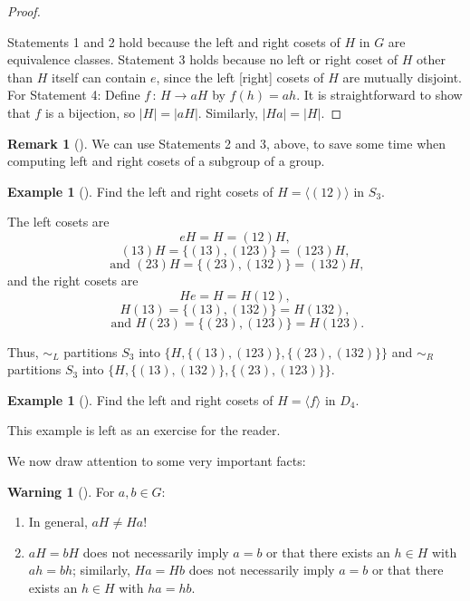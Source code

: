 \documentclass[10pt,]{book}
\theoremstyle{plain}
\theoremstyle{definition}
\theoremstyle{definition}
\newtheorem{remark}[theorem]{Remark}
\newtheorem{warning}[theorem]{Warning}
\theoremstyle{definition}
\newtheorem{example}[theorem]{Example}
\theoremstyle{definition}
\numberwithin{equation}{section}
\def\siml{\sim_L}
\def\simr{\sim_R}
\begin{document}
\begin{proof}\hypertarget{proof-39}{}
Statements 1 and 2 hold because the left and right cosets of \(H\) in \(G\) are equivalence classes. Statement 3 holds because no left or right coset of \(H\) other than \(H\) itself can contain \(e\), since the left [right] cosets of \(H\) are mutually disjoint. For Statement 4: Define \(f\,:\,H\to aH\) by \(f(h)=ah\). It is straightforward to show that \(f\) is a bijection, so \(|H|=|aH|\). Similarly, \(|Ha|=|H|\).%
\end{proof}
\begin{remark}[]\label{remark-38}
We can use Statements 2 and 3, above, to save some time when computing left and right cosets of a subgroup of a group.%
\end{remark}
\begin{example}[]\label{s3_ex}
Find the left and right cosets of \(H=\langle (12)\rangle\) in \(S_3\).%
\par
The left cosets are%
\begin{equation*}
eH=H=(12)H,
\end{equation*}
%
\begin{equation*}
(13)H=\{(13),(123)\}=(123)H,
\end{equation*}
%
\begin{equation*}
\text{ and } (23)H=\{(23),(132)\}=(132)H,
\end{equation*}
and the right cosets are%
\begin{equation*}
He=H=H(12),
\end{equation*}
%
\begin{equation*}
H(13)=\{(13),(132)\}=H(132),
\end{equation*}
%
\begin{equation*}
\text{ and } H(23)=\{(23),(123)\}=H(123).
\end{equation*}
%
\par
Thus, \(\siml\) partitions \(S_3\) into \(\{H,\{(13),(123)\},\{(23),
(132)\}\}\) and \(\simr\) partitions \(S_3\) into \(\{H,\{(13),(132)\},\{(23), (123)\}\}\).%
\end{example}
\begin{example}[]\label{d4_ex}
Find the left and right cosets of \(H=\langle f\rangle\) in \(D_4\).%
\par
This example is left as an exercise for the reader.%
\end{example}
We now draw attention to some very important facts:%
\begin{warning}[]\label{warning-20}
For \(a,b\in G\): \leavevmode%
\begin{enumerate}
\item\hypertarget{li-415}{}In general, \(aH \neq Ha\)!%
\item\hypertarget{li-416}{}\(aH=bH\) does not necessarily imply \(a=b\) or that there exists an \(h\in H\) with \(ah=bh\); similarly, \(Ha=Hb\) does not necessarily imply \(a=b\) or that there exists an \(h\in H\) with \(ha=hb\).%
\end{enumerate}
%
\end{warning}
\end{document}
